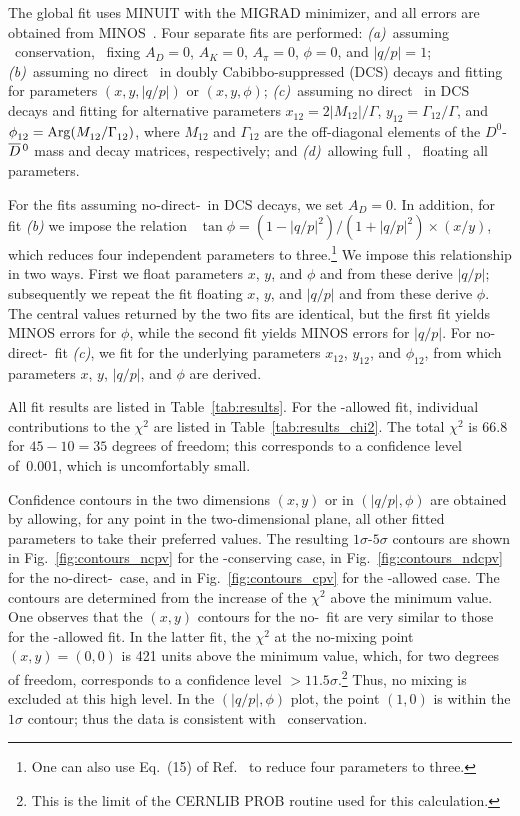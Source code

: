 The global fit uses MINUIT with the MIGRAD minimizer, 
and all errors are obtained from MINOS~\cite{MINUIT:webpage}. 
Four separate fits are performed: 
{\it (a)}\ assuming \cp\ conservation, \ie\ fixing
$A^{}_D\!=\!0$, $A_K\!=\!0$, $A^{}_\pi\!=\!0$, $\phi\!=\!0$, 
and $|q/p|\!=\!1$;
{\it (b)}\ assuming no direct \cpv\ in doubly Cabibbo-suppressed (DCS)
decays and fitting for parameters $(x,y,|q/p|)$ or $(x,y,\phi)$; 
{\it (c)}\ assuming no direct \cpv\ in DCS decays and fitting for
alternative parameters $x^{}_{12}= 2|M^{}_{12}|/\Gamma$, 
$y^{}_{12}= \Gamma^{}_{12}/\Gamma$, and 
$\phi^{}_{12}= {\rm Arg}(M^{}_{12}/\Gamma^{}_{12})$,
where $M^{}_{12}$ and $\Gamma^{}_{12}$ are the off-diagonal
elements of the $D^0$-$\overline{D}{}^{\,0}$ mass and decay matrices, respectively; and
{\it (d)}\ allowing full \cpv, \ie\ floating all parameters. 

For the fits assuming no-direct-\cpv\ in DCS decays, 
we set $A^{}_D\!=\!0$. In addition, for fit 
{\it (b)\/} we impose the relation~\cite{Ciuchini:2007cw,Kagan:2009gb}
$\tan\phi = (1-|q/p|^2)/(1+|q/p|^2)\times (x/y)$, which reduces 
four independent parameters to 
three.\footnote{One can also use Eq.~(15) of Ref.~\cite{Grossman:2009mn}
to reduce four parameters to three.} 
We impose this relationship in two ways. First we float parameters
$x$, $y$, and $\phi$ and from these derive $|q/p|$; subsequently we
repeat the fit floating $x$, $y$, and $|q/p|$ and from these derive 
$\phi$. The central values returned by the two fits are identical,
but the first fit yields MINOS errors for $\phi$, while the second
fit yields MINOS errors for $|q/p|$. For no-direct-\cpv\ fit 
{\it (c)}, we fit for the underlying parameters $x^{}_{12}$, $y^{}_{12}$, 
and $\phi^{}_{12}$, from which parameters $x$, $y$, $|q/p|$, and $\phi$ 
are derived. 

All fit results are listed in 
Table~\ref{tab:results}. For the \cpv-allowed fit,
individual contributions to the $\chi^2$ are listed 
in Table~\ref{tab:results_chi2}. The total $\chi^2$ 
is 66.8 for $45-10=35$ degrees of freedom; this 
corresponds to a confidence level of~0.001,
which is uncomfortably small.

Confidence contours in the two dimensions $(x,y)$ or 
in $(|q/p|,\phi)$ are obtained by allowing, for any point in the
two-dimensional plane, all other fitted parameters to take their 
preferred values. The resulting $1\sigma$-$5\sigma$ contours 
are shown 
in Fig.~\ref{fig:contours_ncpv} for the \cp-conserving case, 
in Fig.~\ref{fig:contours_ndcpv} for the no-direct-\cpv\ case, 
and in Fig.~\ref{fig:contours_cpv} for the \cpv-allowed 
case. The contours are determined from the increase of the
$\chi^2$ above the minimum value.
One observes that the $(x,y)$ contours for the no-\cpv\ fit 
are very similar to those for the \cpv-allowed fit. In the latter
fit, the $\chi^2$ at the no-mixing point $(x,y)\!=\!(0,0)$ is 421
units above the minimum value, which, for two degrees of freedom,
corresponds to a confidence level $>11.5\sigma$.\footnote{This is
the limit of the CERNLIB PROB routine used for this calculation.}
Thus, no mixing is excluded at this high level. In the $(|q/p|,\phi)$
plot, the point $(1,0)$ is within the $1\sigma$ contour; thus the
data is consistent with \cp\ conservation.

